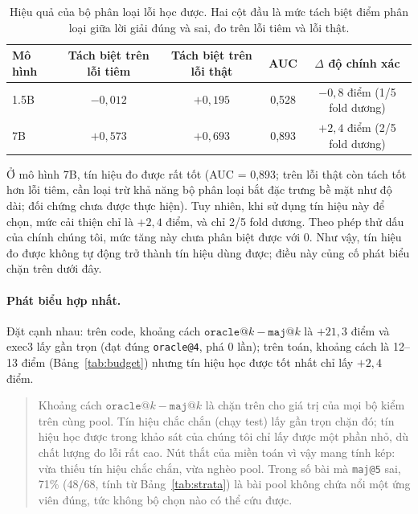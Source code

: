 \documentclass[12pt,a4paper]{article}
\begin{document}
\begin{table}[htbp]
\centering
\small
\begin{tabular}{@{}l c c c c@{}}
\toprule
Mô hình & Tách biệt trên lỗi tiêm & Tách biệt trên lỗi thật & AUC & \(\Delta\) độ chính xác\\
\midrule
1.5B & \(-0{,}012\) & \(+0{,}195\) & 0,528 & \(-0{,}8\) điểm (1/5 fold dương)\\
7B & \(+0{,}573\) & \(+0{,}693\) & 0,893 & \(+2{,}4\) điểm (2/5 fold dương)\\
\bottomrule
\end{tabular}
\caption{Hiệu quả của bộ phân loại lỗi học được. Hai cột đầu là mức tách biệt điểm phân loại giữa lời giải đúng và sai, đo trên lỗi tiêm và lỗi thật.}
\label{tab:clf}
\end{table}

Ở mô hình 7B, tín hiệu đo được rất tốt (AUC = 0,893; trên lỗi thật còn tách tốt hơn lỗi tiêm, cần loại trừ khả năng bộ phân loại bắt đặc trưng bề mặt như độ dài; đối chứng chưa được thực hiện). Tuy nhiên, khi sử dụng tín hiệu này để chọn, mức cải thiện chỉ là \(+2{,}4\) điểm, và chỉ 2/5 fold dương. Theo phép thử dấu của chính chúng tôi, mức tăng này chưa phân biệt được với 0. Như vậy, tín hiệu đo được không tự động trở thành tín hiệu dùng được; điều này củng cố phát biểu chặn trên dưới đây.

\paragraph{Phát biểu hợp nhất.}
Đặt cạnh nhau: trên code, khoảng cách \(\texttt{oracle@}k-\texttt{maj@}k\) là \(+21{,}3\) điểm và exec3 lấy gần trọn (đạt đúng \texttt{oracle@4}, phá 0 lần); trên toán, khoảng cách là 12--13 điểm (Bảng~\ref{tab:budget}) nhưng tín hiệu học được tốt nhất chỉ lấy \(+2{,}4\) điểm.

\begin{quote}
Khoảng cách \(\texttt{oracle@}k - \texttt{maj@}k\) là chặn trên cho giá trị của mọi bộ kiểm trên cùng pool. Tín hiệu chắc chắn (chạy test) lấy gần trọn chặn đó; tín hiệu học được trong khảo sát của chúng tôi chỉ lấy được một phần nhỏ, dù chất lượng đo lỗi rất cao. Nút thắt của miền toán vì vậy mang tính kép: vừa thiếu tín hiệu chắc chắn, vừa nghèo pool. Trong số bài mà \texttt{maj@5} sai, 71\% (48/68, tính từ Bảng~\ref{tab:strata}) là bài pool không chứa nổi một ứng viên đúng, tức không bộ chọn nào có thể cứu được.
\end{quote}
\end{document}
